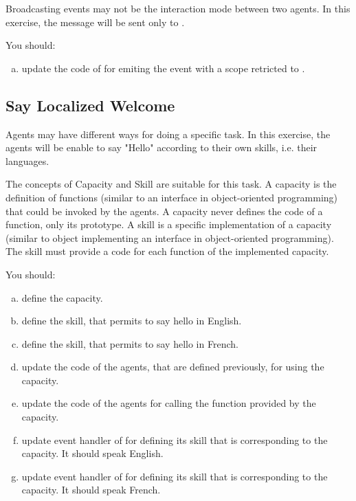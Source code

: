 \documentclass[article,english,nodocumentinfo]{multiagentfrreport}
\begin{document}
Broadcasting events may not be the interaction mode between two agents.
In this exercise, the  message will be sent only to .

You should:
\begin{enumerate}[a)]
\item update the code of  for emiting the event with a scope retricted to .
\end{enumerate}

\subsection{Say Localized Welcome}

Agents may have different ways for doing a specific task.
In this exercise, the agents will be enable to say "Hello" according to their own skills, i.e. their languages.

The concepts of Capacity and Skill are suitable for this task.
A capacity is the definition of functions (similar to an interface in object-oriented programming) that could be invoked by the agents. A capacity never defines the code of a function, only its prototype.
A skill is a specific implementation of a capacity (similar to object implementing an interface in object-oriented programming). The skill must provide a code for each function of the implemented capacity.

You should:
\begin{enumerate}[a)]
\item define the  capacity.
\item define the  skill, that permits to say hello in English.
\item define the  skill, that permits to say hello in French.
\item update the code of the agents, that are defined previously, for using the  capacity.
\item update the code of the agents for calling the function provided by the  capacity.
\item update  event handler of  for defining its skill that is corresponding to the  capacity. It should speak English.
\item update  event handler of  for defining its skill that is corresponding to the  capacity. It should speak French.
\end{enumerate}
\end{document}
